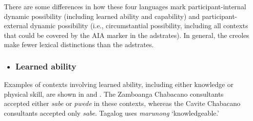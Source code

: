There are some differences in how these four languages mark participant-internal dynamic possibility (including learned ability and capability) and participant-external dynamic possibility (i.e., circumstantial possibility, including all contexts that could be covered by the AIA marker in the adstrates). In general, the creoles make fewer lexical distinctions than the adstrates. 

\begin{itemize}
\item \subsubsection{Learned ability}
\end{itemize}

Examples of contexts involving learned ability, including either knowledge or physical skill, are shown in  and . The Zamboanga Chabacano consultants accepted either \textit{sabe} or \textit{pwede} in these contexts, whereas the Cavite Chabacano consultants accepted only \textit{sabe}. Tagalog uses \textit{marunong} ‘knowledgeable.’ 

{}\\

